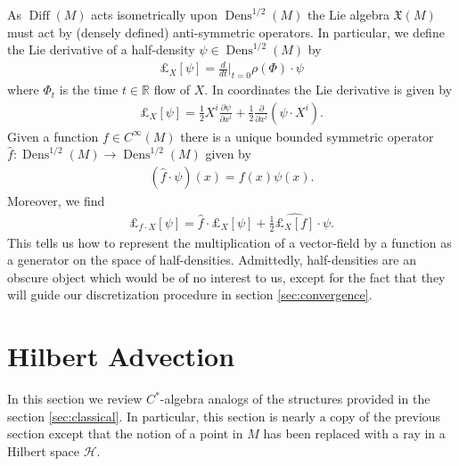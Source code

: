 \documentclass[12pt]{amsart}
\newcommand{\pder}[2]{\ensuremath{\frac{ \partial #1}{\partial #2}}}
\newcommand{\R}{\ensuremath{\mathbb{R}}}
\DeclareMathOperator{\Diff}{Diff}
\DeclareMathOperator{\Dens}{Dens}
\begin{document}
As $\Diff(M)$ acts isometrically upon $\Dens^{1/2}(M)$ the Lie algebra $\mathfrak{X}(M)$ must act by (densely defined) anti-symmetric operators.
In particular, we define the Lie derivative of a half-density $\psi \in \Dens^{1/2}(M)$ by
\begin{align*}
	\pounds_X[ \psi ] = \frac{d}{dt} |_{t=0} \rho(\Phi) \cdot \psi
\end{align*}
where $\Phi_t$ is the time $t \in \R$ flow of $X$.
In coordinates the Lie derivative is given by
\begin{align*}
	\pounds_X[\psi] = \frac{1}{2} X^i \pder{\psi}{x^i} + \frac{1}{2} \pder{}{x^i} \left(\psi \cdot X^i \right).
\end{align*}
Given a function $f \in C^\infty(M)$ there is a unique bounded symmetric operator $\hat{f} : \Dens^{1/2}(M) \to \Dens^{1/2}(M)$
given by
\begin{align}
	(\hat{f} \cdot \psi)(x) = f(x) \psi(x). \label{eq:function_op}
\end{align}
Moreover, we find
\begin{align}
	\pounds_{f\cdot X}[\psi] = \hat{f} \cdot \pounds_X[\psi] + \frac{1}{2} \widehat{\pounds_{X}[f] }\cdot \psi. \label{eq:module}
\end{align}
This tells us how to represent the multiplication of a vector-field by a function as a generator on the space of half-densities.
Admittedly, half-densities are an obscure object which would be of no interest to us, except for the fact that they will guide
our discretization procedure in section \ref{sec:convergence}.

\section{Hilbert Advection}
\label{sec:Hilbert}
In this section we review $C^*$-algebra analogs of the structures provided in the section \ref{sec:classical}.
In particular, this section is nearly a copy of the previous section except that the notion of a point in $M$ has been replaced with a ray in a Hilbert space $\mathcal{H}$.
\end{document}

